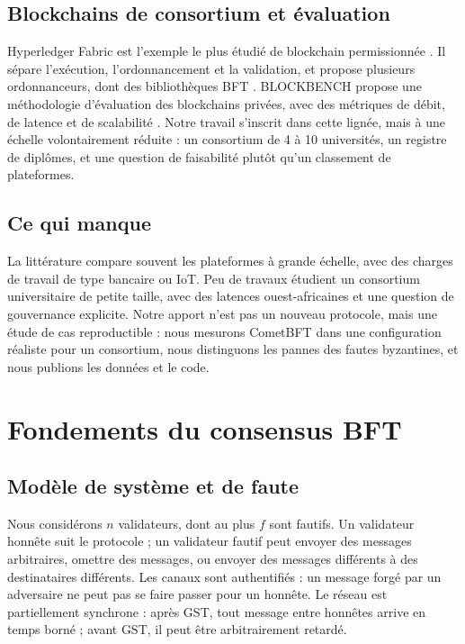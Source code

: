 \documentclass[conference]{IEEEtran}
\begin{document}
\subsection{Blockchains de consortium et évaluation}

Hyperledger Fabric est l'exemple le plus étudié de blockchain permissionnée \cite{androulaki2018fabric}. Il sépare l'exécution, l'ordonnancement et la validation, et propose plusieurs ordonnanceurs, dont des bibliothèques BFT \cite{barger2021bft}. BLOCKBENCH propose une méthodologie d'évaluation des blockchains privées, avec des métriques de débit, de latence et de scalabilité \cite{dinh2017blockbench}. Notre travail s'inscrit dans cette lignée, mais à une échelle volontairement réduite : un consortium de 4 à 10 universités, un registre de diplômes, et une question de faisabilité plutôt qu'un classement de plateformes.

\subsection{Ce qui manque}

La littérature compare souvent les plateformes à grande échelle, avec des charges de travail de type bancaire ou IoT. Peu de travaux étudient un consortium universitaire de petite taille, avec des latences ouest-africaines et une question de gouvernance explicite. Notre apport n'est pas un nouveau protocole, mais une étude de cas reproductible : nous mesurons CometBFT dans une configuration réaliste pour un consortium, nous distinguons les pannes des fautes byzantines, et nous publions les données et le code.

\section{Fondements du consensus BFT}
\label{sec:fondements}

\subsection{Modèle de système et de faute}

Nous considérons $n$ validateurs, dont au plus $f$ sont fautifs. Un validateur honnête suit le protocole ; un validateur fautif peut envoyer des messages arbitraires, omettre des messages, ou envoyer des messages différents à des destinataires différents. Les canaux sont authentifiés : un message forgé par un adversaire ne peut pas se faire passer pour un honnête. Le réseau est partiellement synchrone : après GST, tout message entre honnêtes arrive en temps borné ; avant GST, il peut être arbitrairement retardé.
\end{document}
